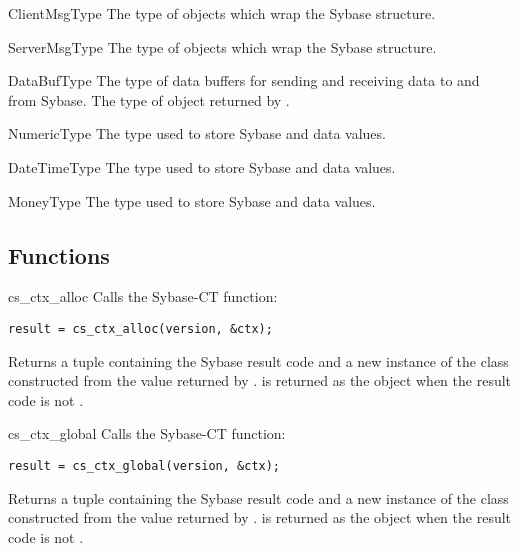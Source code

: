 \begin{datadesc}{ClientMsgType}
The type of  objects which wrap the Sybase
 structure.
\end{datadesc}

\begin{datadesc}{ServerMsgType}
The type of  objects which wrap the Sybase
 structure.
\end{datadesc}

\begin{datadesc}{DataBufType}
The type of data buffers for sending and receiving data to and from
Sybase.  The type of object returned by .
\end{datadesc}

\begin{datadesc}{NumericType}
The type used to store Sybase  and 
data values.
\end{datadesc}

\begin{datadesc}{DateTimeType}
The type used to store Sybase  and
 data values.
\end{datadesc}

\begin{datadesc}{MoneyType}
The type used to store Sybase  and 
data values.
\end{datadesc}

\subsection{Functions}

\begin{funcdesc}{cs_ctx_alloc}{}
Calls the Sybase-CT  function:

\begin{verbatim}
result = cs_ctx_alloc(version, &ctx);
\end{verbatim}

Returns a tuple containing the Sybase result code and a new instance
of the  class constructed from the  value
returned by .   is returned as the
 object when the result code is not
.
\end{funcdesc}

\begin{funcdesc}{cs_ctx_global}{}
Calls the Sybase-CT  function:

\begin{verbatim}
result = cs_ctx_global(version, &ctx);
\end{verbatim}

Returns a tuple containing the Sybase result code and a new instance
of the  class constructed from the  value
returned by .   is returned as the
 object when the result code is not
.
\end{funcdesc}

